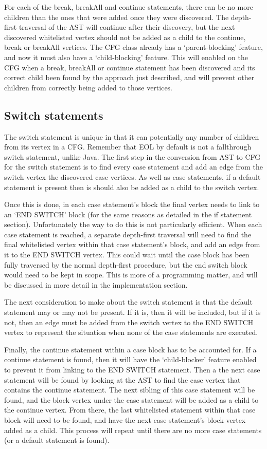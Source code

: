 For each of the break, breakAll and continue statements, there can be no more children than the ones that were added once they were discovered. The depth-first traversal of the AST will continue after their discovery, but the next discovered whitelisted vertex should not be added as a child to the continue, break or breakAll vertices. The CFG class already has a `parent-blocking' feature, and now it must also have a `child-blocking' feature. This will enabled on the CFG when a break, breakAll or continue statement has been discovered and its correct child been found by the approach just described, and will prevent other children from correctly being added to those vertices.
\subsection{Switch statements}

The switch statement is unique in that it can potentially any number of children from its vertex in a CFG. Remember that EOL by default is not a fallthrough switch statement, unlike Java. The first step in the conversion from AST to CFG for the switch statement is to find every case statement and add an edge from the switch vertex the discovered case vertices. As well as case statements, if a default statement is present then is should also be added as a child to the switch vertex.

Once this is done, in each case statement's block the final vertex needs to link to an `END SWITCH' block (for the same reasons as detailed in the if statement section). Unfortunately the way to do this is not particularly efficient. When each case statement is reached, a separate depth-first traversal will need to find the final whitelisted vertex within that case statement's block, and add an edge from it to the END SWITCH vertex. This could wait until the case block has been fully traversed by the normal depth-first procedure, but the end switch block would need to be kept in scope. This is more of a programming matter, and will be discussed in more detail in the implementation section.

The next consideration to make about the switch statement is that the default statement may or may not be present. If it is, then it will be included, but if it is not, then an edge must be added from the switch vertex to the END SWITCH vertex to represent the situation when none of the case statements are executed.

Finally, the continue statement within a case block has to be accounted for. If a continue statement is found, then it will have the `child-blocker' feature enabled to prevent it from linking to the END SWITCH statement. Then a the next case statement will be found by looking at the AST to find the case vertex that contains the continue statement. The next sibling of this case statement will be found, and the block vertex under the case statement will be added as a child to the continue vertex. From there, the last whitelisted statement within that case block will need to be found, and have the next case statement's block vertex added as a child. This process will repeat until there are no more case statements (or a default statement is found).

